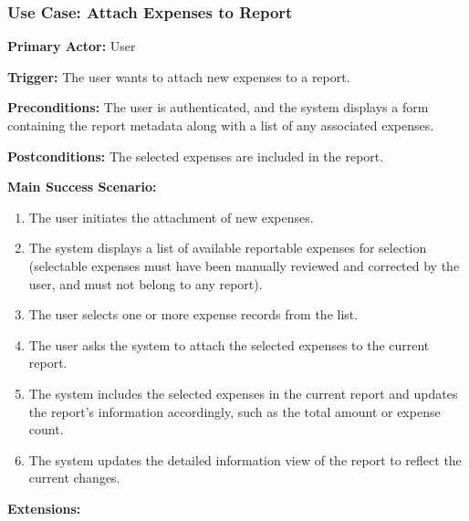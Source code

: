 \subsubsection{\textbf{Use Case: Attach Expenses to Report}}

\textbf{Primary Actor:} User

\textbf{Trigger:} The user wants to attach new expenses to a report.

\textbf{Preconditions:} The user is authenticated, and the system displays a form containing the report metadata along with a list of any associated expenses.

\textbf{Postconditions:} The selected expenses are included in the report.

\vspace{0.5cm}

\textbf{Main Success Scenario:}

\begin{enumerate} [leftmargin=0.75cm, noitemsep]
\item The user initiates the attachment of new expenses.
\item The system displays a list of available reportable expenses for selection (selectable expenses must have been manually reviewed and corrected by the user, and must not belong to any report).
\item The user selects one or more expense records from the list.
\item The user asks the system to attach the selected expenses to the current report.
\item The system includes the selected expenses in the current report and updates the report’s information accordingly, such as the total amount or expense count.
\item The system updates the detailed information view of the report to reflect the current changes.
\end{enumerate}

\vspace{0.3cm}

\textbf{Extensions:}

